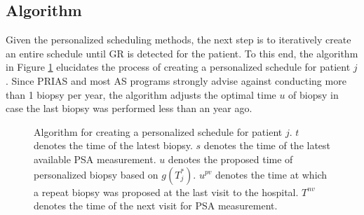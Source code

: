 \subsection{Algorithm}
\label{subsec : pers_sched_algorithm}
Given the personalized scheduling methods, the next step is to iteratively create an entire schedule until GR is detected for the patient. To this end, the algorithm in Figure \ref{fig : sched_algorithm} elucidates the process of creating a personalized schedule for patient $j$. Since PRIAS and most AS programs strongly advise against conducting more than 1 biopsy per year, the algorithm adjusts the optimal time $u$ of biopsy in case the last biopsy was performed less than an year ago.

\begin{figure}
\centering
\captionsetup{justification=centering}

\caption{Algorithm for creating a personalized schedule for patient $j$. $t$ denotes the time of the latest biopsy. $s$ denotes the time of the latest available PSA measurement. $u$ denotes the proposed time of personalized biopsy based on $g(T^*_j)$.  $u^{pv}$ denotes the time at which a repeat biopsy was proposed at the last visit to the hospital. $T^{nv}$ denotes the time of the next visit for PSA measurement.} 
\label{fig : sched_algorithm}
\end{figure}
